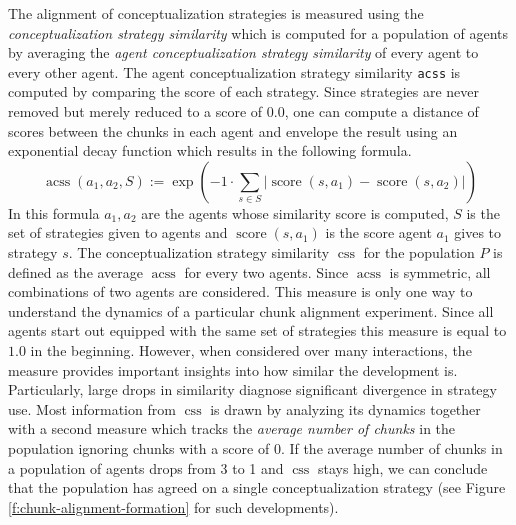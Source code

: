 The alignment of conceptualization strategies is measured using the
\emph{conceptualization strategy similarity} which is computed for a population of agents 
by averaging the \emph{agent conceptualization strategy similarity} of every agent to every other
agent. The agent conceptualization strategy similarity {\footnotesize\tt acss} is computed by comparing
the score of each strategy. Since strategies are never removed but merely reduced
to a score of $0.0$, one can compute a distance of scores between the chunks in each agent
and envelope the result using an exponential decay function which results in the following formula.
\begin{equation}
\operatorname{acss}(a_1,a_2,S):= \operatorname{exp} \left( -1 \cdot \sum_{s \in S} \left|\operatorname{score}(s,a_1) - \operatorname{score}(s,a_2)\right|\right) 
\end{equation}
In this formula $a_1,a_2$ are the agents whose similarity score is computed, $S$ is the set 
of strategies given
to agents and $\operatorname{score}(s,a_1)$ is the score agent $a_1$ gives to strategy $s$.
The conceptualization strategy similarity $\operatorname{css}$ for the population $P$ is defined 
as the average $\operatorname{acss}$
for every two agents. Since $\operatorname{acss}$ is symmetric, all combinations of two agents are
considered. This measure is only one way to understand the dynamics of a particular chunk alignment 
experiment. Since all agents start out equipped with the same set of strategies this measure is equal to $1.0$
in the beginning. However, when considered over many interactions, the measure provides important insights 
into how similar the development is. Particularly, large drops in similarity diagnose significant divergence in strategy use. Most information from $\operatorname{css}$ is drawn by analyzing its dynamics together with a 
second measure which tracks the \emph{average number of chunks} in the population ignoring chunks with a 
score of $0$. If the average number of chunks in a population of agents drops from 3 to 1 and 
$\operatorname{css}$ stays
high, we can conclude that the population has agreed on a single conceptualization strategy (see Figure
\ref{f:chunk-alignment-formation} for such developments). 

